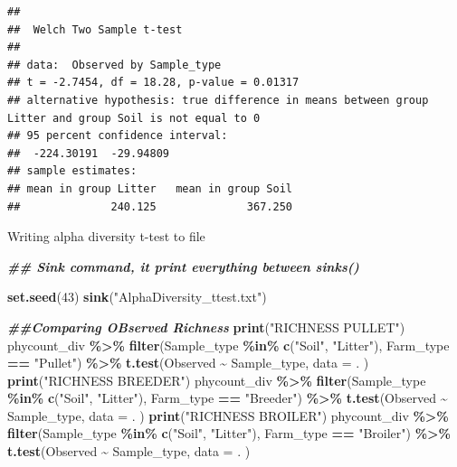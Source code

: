 \documentclass[
]{article}
\newenvironment{Shaded}{\begin{snugshade}}{\end{snugshade}}
\newcommand{\AttributeTok}[1]{\textcolor[rgb]{0.13,0.29,0.53}{#1}}
\newcommand{\DecValTok}[1]{\textcolor[rgb]{0.00,0.00,0.81}{#1}}
\newcommand{\DocumentationTok}[1]{\textcolor[rgb]{0.56,0.35,0.01}{\textbf{\textit{#1}}}}
\newcommand{\FunctionTok}[1]{\textcolor[rgb]{0.13,0.29,0.53}{\textbf{#1}}}
\newcommand{\NormalTok}[1]{#1}
\newcommand{\SpecialCharTok}[1]{\textcolor[rgb]{0.81,0.36,0.00}{\textbf{#1}}}
\newcommand{\StringTok}[1]{\textcolor[rgb]{0.31,0.60,0.02}{#1}}
\begin{document}
\begin{verbatim}
## 
##  Welch Two Sample t-test
## 
## data:  Observed by Sample_type
## t = -2.7454, df = 18.28, p-value = 0.01317
## alternative hypothesis: true difference in means between group Litter and group Soil is not equal to 0
## 95 percent confidence interval:
##  -224.30191  -29.94809
## sample estimates:
## mean in group Litter   mean in group Soil 
##              240.125              367.250
\end{verbatim}

Writing alpha diversity t-test to file

\begin{Shaded}
\begin{Highlighting}[]
\DocumentationTok{\#\# Sink command, it print everything between sinks()}

\FunctionTok{set.seed}\NormalTok{(}\DecValTok{43}\NormalTok{)}
\FunctionTok{sink}\NormalTok{(}\StringTok{"AlphaDiversity\_ttest.txt"}\NormalTok{)}
 
   \DocumentationTok{\#\#Comparing OBserved Richness}
   \FunctionTok{print}\NormalTok{(}\StringTok{"RICHNESS PULLET"}\NormalTok{)}
\NormalTok{   phycount\_div }\SpecialCharTok{\%\textgreater{}\%}
     \FunctionTok{filter}\NormalTok{(Sample\_type }\SpecialCharTok{\%in\%} \FunctionTok{c}\NormalTok{(}\StringTok{"Soil"}\NormalTok{, }\StringTok{"Litter"}\NormalTok{),}
\NormalTok{            Farm\_type }\SpecialCharTok{==} \StringTok{"Pullet"}\NormalTok{) }\SpecialCharTok{\%\textgreater{}\%}
     \FunctionTok{t.test}\NormalTok{(Observed }\SpecialCharTok{\textasciitilde{}}\NormalTok{ Sample\_type, }
          \AttributeTok{data =}\NormalTok{ .}
\NormalTok{          )}
   \FunctionTok{print}\NormalTok{(}\StringTok{"RICHNESS BREEDER"}\NormalTok{)}
\NormalTok{   phycount\_div }\SpecialCharTok{\%\textgreater{}\%}
     \FunctionTok{filter}\NormalTok{(Sample\_type }\SpecialCharTok{\%in\%} \FunctionTok{c}\NormalTok{(}\StringTok{"Soil"}\NormalTok{, }\StringTok{"Litter"}\NormalTok{),}
\NormalTok{            Farm\_type }\SpecialCharTok{==} \StringTok{"Breeder"}\NormalTok{) }\SpecialCharTok{\%\textgreater{}\%}
     \FunctionTok{t.test}\NormalTok{(Observed }\SpecialCharTok{\textasciitilde{}}\NormalTok{ Sample\_type, }
          \AttributeTok{data =}\NormalTok{ .}
\NormalTok{          )}
   \FunctionTok{print}\NormalTok{(}\StringTok{"RICHNESS BROILER"}\NormalTok{)}
\NormalTok{   phycount\_div }\SpecialCharTok{\%\textgreater{}\%}
     \FunctionTok{filter}\NormalTok{(Sample\_type }\SpecialCharTok{\%in\%} \FunctionTok{c}\NormalTok{(}\StringTok{"Soil"}\NormalTok{, }\StringTok{"Litter"}\NormalTok{),}
\NormalTok{            Farm\_type }\SpecialCharTok{==} \StringTok{"Broiler"}\NormalTok{) }\SpecialCharTok{\%\textgreater{}\%}
     \FunctionTok{t.test}\NormalTok{(Observed }\SpecialCharTok{\textasciitilde{}}\NormalTok{ Sample\_type, }
          \AttributeTok{data =}\NormalTok{ .}
\NormalTok{          )}
   

\end{Highlighting}
\end{Shaded}
\end{document}
